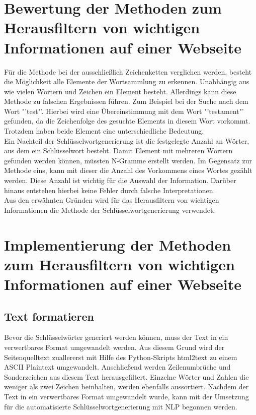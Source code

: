 \section{Bewertung der Methoden zum Herausfiltern von wichtigen Informationen auf einer Webseite}
Für die Methode bei der ausschließlich Zeichenketten verglichen werden, besteht die Möglichkeit alle Elemente der Wortsammlung zu erkennen. Unabhängig aus wie vielen Wörtern und Zeichen ein Element besteht. Allerdings kann diese Methode zu falschen Ergebnissen führen. Zum Beispiel bei der Suche nach dem Wort "'test"'. Hierbei wird eine Übereinstimmung mit dem Wort "'testament"' gefunden, da die Zeichenfolge des gesuchte Elements in diesem Wort vorkommt. Trotzdem haben beide Element eine unterschiedliche Bedeutung. \\
Ein Nachteil der Schlüsselwortgenerierung ist die festgelegte Anzahl an Wörter, aus dem ein Schlüsselwort besteht. Damit Element mit mehreren Wörtern gefunden werden können, müssten N-Gramme erstellt werden. Im Gegensatz zur Methode eins, kann mit dieser die Anzahl des Vorkommens eines Wortes gezählt werden. Diese Anzahl ist wichtig für die Auswahl der Information. Darüber hinaus entstehen hierbei keine Fehler durch falsche Interpretationen.\\
Aus den erwähnten Gründen wird für das Herausfiltern von wichtigen Informationen die Methode der Schlüsselwortgenerierung verwendet.


\section{Implementierung der Methoden zum Herausfiltern von wichtigen Informationen auf einer Webseite}
	\subsection{Text formatieren}
	\label{subsec:TextFormatieren}
	Bevor die Schlüsselwörter generiert werden können, muss der Text in ein verwertbares Format umgewandelt werden. Aus diesem Grund wird der Seitenquelltext zuallererst mit Hilfe des Python-Skripts html2text zu einem ASCII Plaintext umgewandelt.\cite{html2text} Anschließend werden Zeilenumbrüche und Sonderzeichen aus diesem Text herausgefiltert. Einzelne Wörter und Zahlen die weniger als zwei Zeichen beinhalten, werden ebenfalls aussortiert. Nachdem der Text in ein verwertbares Format umgewandelt wurde, kann mit der Umsetzung für die automatisierte Schlüsselwortgenerierung mit NLP begonnen werden.
	
